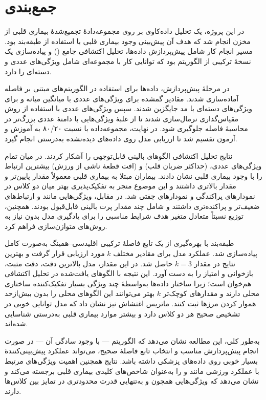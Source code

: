 \section{جمع‌بندی}

در این پروژه، یک تحلیل داده‌کاوی بر روی مجموعه‌دادهٔ تجمیع‌شدهٔ بیماری قلبی از مخزن
 انجام شد که هدف آن پیش‌بینی وجود بیماری قلبی با استفاده از
طبقه‌بند  بود. مسیر انجام کار شامل پیش‌پردازش داده‌ها، تحلیل اکتشافی
جامع () و پیاده‌سازی یک نسخهٔ ترکیبی از الگوریتم  بود که توانایی کار با مجموعه‌ای
شامل ویژگی‌های عددی و دسته‌ای را دارد.

در مرحلهٔ پیش‌پردازش، داده‌ها برای استفاده در الگوریتم‌های مبتنی بر فاصله آماده‌سازی شدند. مقادیر
گمشده برای ویژگی‌های عددی با میانگین میانه و برای ویژگی‌های دسته‌ای با مد جایگزین شدند. سپس
ویژگی‌های عددی با استفاده از روش مقیاس‌گذاری  نرمال‌سازی شدند تا از غلبهٔ ویژگی‌هایی با
دامنهٔ عددی بزرگ‌تر در محاسبهٔ فاصله جلوگیری شود. در نهایت، مجموعه‌داده با نسبت ۸۰/۲۰ به آموزش و
آزمون تقسیم شد تا ارزیابی مدل روی داده‌های دیده‌نشده به‌درستی انجام گیرد.

نتایج تحلیل اکتشافی الگوهای بالینی قابل‌توجهی را آشکار کردند. در میان تمام ویژگی‌های عددی،
 (حداکثر ضربان قلب) و  (افت قطعهٔ  ناشی از ورزش) بیشترین ارتباط را
با وجود بیماری قلبی نشان دادند. بیماران مبتلا به بیماری قلبی معمولاً مقدار  پایین‌تر و
مقدار  بالاتری داشتند و این موضوع منجر به تفکیک‌پذیری بهتر میان دو کلاس در نمودارهای
پراکندگی و نمودارهای جفتی شد. در مقابل، ویژگی‌هایی مانند  و  ارتباط‌های ضعیف‌تر
و پراکنده‌تری داشتند و شامل چند مقدار پرت بالینی قابل‌قبول بودند. همچنین، توزیع نسبتاً متعادل متغیر
هدف شرایط مناسبی را برای یادگیری مدل بدون نیاز به روش‌های متوازن‌سازی فراهم کرد.

طبقه‌بند  با بهره‌گیری از یک تابع فاصلهٔ ترکیبی اقلیدسی–همینگ به‌صورت کامل پیاده‌سازی شد.
عملکرد مدل برای مقادیر مختلف $k$ مورد ارزیابی قرار گرفت و بهترین نتایج در مقدار $k = 3$ حاصل شد.
در این مقدار، مدل بالاترین دقت، دقت مثبت، بازخوانی و امتیاز  را به دست آورد. این نتیجه با الگوهای
یافت‌شده در تحلیل اکتشافی هم‌خوان است؛ زیرا ساختار داده‌ها به‌واسطهٔ چند ویژگی بسیار تفکیک‌کننده
ساختاری محلی دارند و مقدارهای کوچک‌تر $k$ بهتر می‌توانند این الگوهای محلی را بدون بیش‌ازحد هموار
کردن مرزها ثبت کنند. ماتریس اغتشاش نیز نشان داد که مدل توانایی خوبی در تشخیص صحیح هر دو کلاس دارد و
بیشتر موارد بیماری قلبی به‌درستی شناسایی شده‌اند.

به‌طور کلی، این مطالعه نشان می‌دهد که الگوریتم  — با وجود سادگی آن — در صورت انجام
پیش‌پردازش مناسب و انتخاب تابع فاصلهٔ صحیح، می‌تواند عملکرد پیش‌بینی‌کنندهٔ بسیار خوبی روی داده‌های
پزشکی داشته باشد. نتایج همچنین اهمیت ویژگی‌های مرتبط با عملکرد ورزشی مانند  و
 را به‌عنوان شاخص‌های کلیدی بیماری قلبی برجسته می‌کند و نشان می‌دهد که ویژگی‌هایی
همچون  و  به‌تنهایی قدرت محدودتری در تمایز بین کلاس‌ها دارند.

